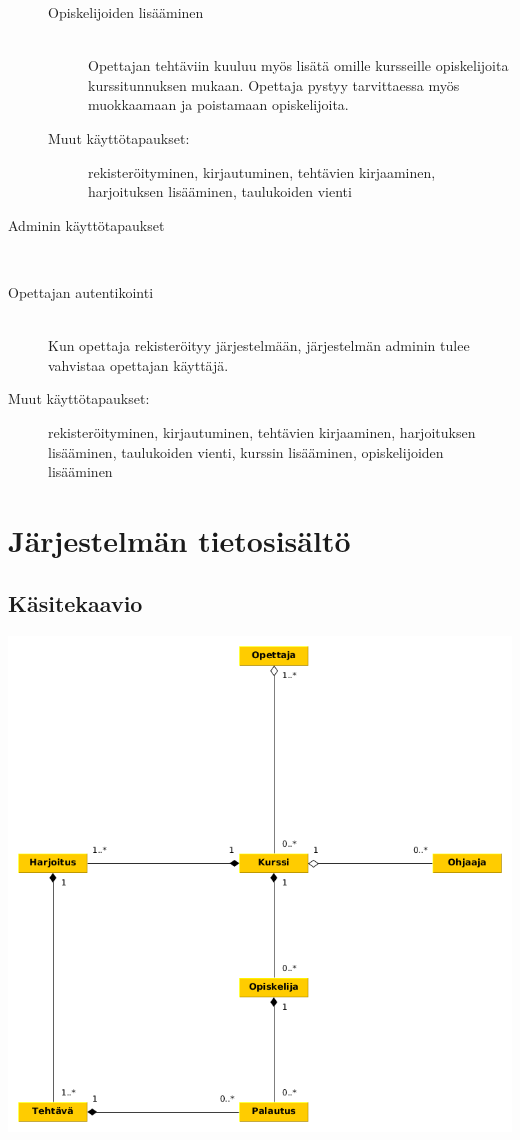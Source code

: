 \documentclass[a4paper,12pt, titlepage]{article}
\begin{document}
\begin{description}
\begin{description}
		\item[Opiskelijoiden lisääminen] \hfill \\
		Opettajan tehtäviin kuuluu myös lisätä omille kursseille opiskelijoita
		kurssitunnuksen mukaan. Opettaja pystyy tarvittaessa myös muokkaamaan
		ja poistamaan opiskelijoita.
		\item[Muut käyttötapaukset:] rekisteröityminen, kirjautuminen,
		tehtävien kirjaaminen, harjoituksen lisääminen, taulukoiden vienti
	\end{description}
	\item[Adminin käyttötapaukset] \hfill \\
		\item[Opettajan autentikointi] \hfill \\
		Kun opettaja rekisteröityy järjestelmään, järjestelmän adminin
		tulee vahvistaa opettajan käyttäjä.
		\item[Muut käyttötapaukset:] rekisteröityminen, kirjautuminen,
		tehtävien kirjaaminen, harjoituksen lisääminen, taulukoiden vienti,
		kurssin lisääminen, opiskelijoiden lisääminen
\end{description}

\section{Järjestelmän tietosisältö}

\subsection{Käsitekaavio}

\includegraphics[scale=0.5]{kasitekaavio}
\end{document}
